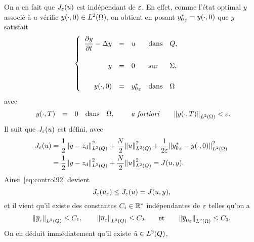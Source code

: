 On a en fait que $J_{\varepsilon}(u)$ est indépendant de $\varepsilon$. En effet, comme
l'état optimal $y$ associé à $u$ vérifie
${y}\!\left({\cdot, 0}\right)\in L^{2}\!\left({\Omega}\right)$, on obtient en posant
${y_{0}^{*}}_{\varepsilon} = {y}\!\left({\cdot, 0}\right)$ que $y$ satisfait
\begin{equation*}
    \begin{cases}\displaystyle
        \begin{array}{rclll}
            \dfrac{\partial{}y}{\partial{}t} - \Delta y & = & u & \text{dans} & Q,\\
            \\
            y & = & 0 & \text{sur} & \Sigma,\\
            \\
            {y}\!\left({\cdot, 0}\right) & = & {y_{0}^{*}}_{\varepsilon} & \text{dans} &
            \Omega
        \end{array}
    \end{cases}
\end{equation*}
avec
\begin{equation*}
    \begin{array}{rclll}
        {y}\!\left({\cdot,T}\right) & = & 0 & \text{dans} & \Omega,
    \end{array}
    \qquad\text{\textit{a fortiori}}\qquad {\left\|{ {y}\!\left({\cdot,T}\right)  }\right\|}_{L^{2}\left({\Omega}\right)} <
    \varepsilon.
\end{equation*}
Il suit que $J_{\varepsilon}(u)$ est défini, avec
\begin{equation*}
    \begin{split}
        J_{\veps}(u) &= \dfrac{1}{2}\normecq{y - z_{d}} +
        \dfrac{N}{2}\normecq{u} + \dfrac{1}{2\veps}\normecohm{%
            {y_{0}^{*}}_{\veps} - \condinitiale{y}
        }\\
        & = \dfrac{1}{2}\normecq{y - z_{d}} + \dfrac{N}{2}\normecq{u} =
        J(u,y).
    \end{split}
\end{equation*}
Ainsi~\eqref{eq:control92} devient
\begin{equation}\label{eq:control95}
    J_{\varepsilon}\!\left({{\overline{u}}_{\varepsilon}}\right) \leq J_{\varepsilon}(u) = J(u,y),
\end{equation}
et il vient qu'il existe des constantes $C_{i}\in{\mathbb{R}}^{*}$ indépendantes
de $\varepsilon$ telles qu'on a
\begin{equation*}
    {\left\|{ {\overline{y}}_{\varepsilon}  }\right\|}_{L^{2}\left({Q}\right)} \leq C_{1},\qquad
    {\left\|{ {\overline{u}}_{\varepsilon}  }\right\|}_{L^{2}\left({Q}\right)}\leq C_{2}\qquad\text{et}\qquad
    {\left\|{{\overline{y}_{0}}_{\varepsilon} }\right\|}_{L^{2}\left({\Omega}\right)}\leq C_{3}.
\end{equation*}
On en déduit immédiatement qu'il existe $\hat{u}\in L^{2}\!\left({Q}\right)$,
